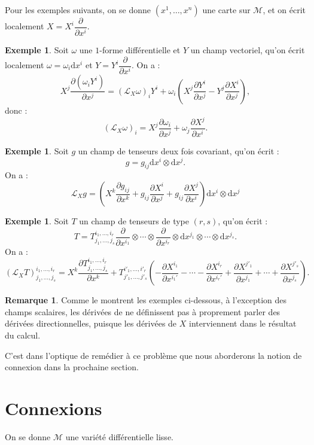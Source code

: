 \documentclass[12pt,a4paper]{article}
\theoremstyle{definition}
\newtheorem{ex}[thm]{Exemple}
\newtheorem{rqe}[thm]{Remarque}
\begin{document}
Pour les exemples suivants, on se donne $(x^1,\ldots,x^n)$ une carte sur $\mathcal{M}$, et on écrit localement $X=X^i\dfrac{\partial}{\partial x^i}$.
\begin{ex}
Soit $\omega$ une $1$-forme différentielle et $Y$ un champ vectoriel, qu'on écrit localement $\omega=\omega_i\mathrm{d}x^i$ et $Y=Y^i\dfrac{\partial}{\partial x^i}$. On a :
$$
X^j\dfrac{\partial(\omega_iY^i)}{\partial x^j}=\left(\mathcal{L}_X\omega\right)_iY^i+\omega_i\left(X^j\dfrac{\partial Y^i}{\partial x^j}-Y^j\dfrac{\partial X^i}{\partial x^j}\right),
$$
donc :
$$
\left(\mathcal{L}_X\omega\right)_i=X^j\dfrac{\partial\omega_i}{\partial x^j}+\omega_j\dfrac{\partial X^j}{\partial x^i}.
$$
\end{ex}
\begin{ex}
Soit $g$ un champ de tenseurs deux fois covariant, qu'on écrit :
$$g=g_{ij}\mathrm{d}x^i\otimes\mathrm{d}x^j.$$
On a :
$$
\mathcal{L}_Xg=\left(X^k\dfrac{\partial g_{ij}}{\partial x^k}+g_{ij}\dfrac{\partial X^i}{\partial x^j}+g_{ij}\dfrac{\partial X^j}{\partial x^i}\right)\mathrm{d}x^i\otimes\mathrm{d}x^j
$$
\end{ex}
\begin{ex}
Soit $T$ un champ de tenseurs de type $(r,s)$, qu'on écrit :
$$T=T^{i_1,\ldots,i_r}_{j_1,\ldots,j_s}\dfrac{\partial}{\partial x^{i_1}}\otimes\cdots\otimes\dfrac{\partial}{\partial x^{i_r}}\otimes\mathrm{d}x^{j_1}\otimes\cdots\otimes\mathrm{d}x^{j_s}.$$
On a :
$$
\left(\mathcal{L}_XT\right)^{i_1,\ldots,i_r}_{j_1,\ldots,j_s}=X^k\dfrac{\partial T^{i_1,\ldots,i_r}_{j_1,\ldots,j_s}}{\partial x^k}+T^{i'_1,\ldots,i'_r}_{j'_1,\ldots,j'_s}\left(-\dfrac{\partial X^{i_1}}{\partial x^{i_1'}}-\cdots-\dfrac{\partial X^{i_r}}{\partial x^{i_r'}}+\dfrac{\partial X^{j'_1}}{\partial x^{j_1}}+\cdots+\dfrac{\partial X^{j'_s}}{\partial x^{j_s}}\right).
$$
\end{ex}
\begin{rqe}
Comme le montrent les exemples ci-dessous, à l'exception des champs scalaires, les dérivées de  ne définissent pas à proprement parler des dérivées directionnelles, puisque les dérivées de $X$ interviennent dans le résultat du calcul.

C'est dans l'optique de remédier à ce problème que nous aborderons la notion de connexion dans la prochaine section.
\end{rqe}
\newpage
\section{Connexions}
On se donne $\mathcal{M}$ une variété différentielle lisse.
\end{document}
